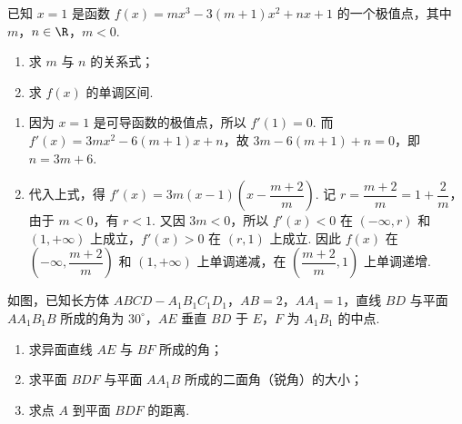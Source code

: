 \begin{problem}
已知 \(x = 1\) 是函数 \(f(x) = mx^3 - 3(m + 1)x^2 + nx + 1\) 的一个极值点，其中 \(m\)，\(n \in \R\)，\(m < 0\).

\begin{enumerate}
\item 求 \(m\) 与 \(n\) 的关系式；
\item 求 \( f(x) \) 的单调区间.
\end{enumerate}
\end{problem}

\begin{solution}
\begin{enumerate}
\item 因为 \(x=1\) 是可导函数的极值点，所以 \(f'(1)=0\). 而 \(f'(x)=3mx^2-6(m+1)x+n\)，故 \(3m-6(m+1)+n=0\)，即 \(n=3m+6\).
\item 代入上式，得
\(f'(x)=3m\left(x-1\right)\left(x-\dfrac{m+2}{m}\right)\). 记 \(r=\dfrac{m+2}{m}=1+\dfrac2m\)，由于 \(m<0\)，有 \(r<1\). 又因 \(3m<0\)，所以 \(f'(x)<0\) 在 \((-\infty,r)\) 和 \((1,+\infty)\) 上成立，\(f'(x)>0\) 在 \((r,1)\) 上成立. 因此 \(f(x)\) 在 \(\left(-\infty,\dfrac{m+2}{m}\right)\) 和 \((1,+\infty)\) 上单调递减，在 \(\left(\dfrac{m+2}{m},1\right)\) 上单调递增.
\end{enumerate}
\end{solution}

\begin{problem}
如图，已知长方体 \(ABCD - A_{1}B_{1}C_{1}D_{1}\)，\(AB = 2\)，\(AA_{1} = 1\)，直线 \(BD\) 与平面 \(AA_{1}B_{1}B\) 所成的角为 \(30^{\circ}\)，\(AE\) 垂直 \(BD\) 于 \(E\)，\(F\) 为 \(A_{1}B_{1}\) 的中点.

\begin{enumerate}
\item 求异面直线 \(AE\) 与 \(BF\) 所成的角；
\item 求平面 \(BDF\) 与平面 \(AA_{1}B\) 所成的二面角（锐角）的大小；
\item 求点 \(A\) 到平面 \(BDF\) 的距离.
\end{enumerate}

\end{problem}

